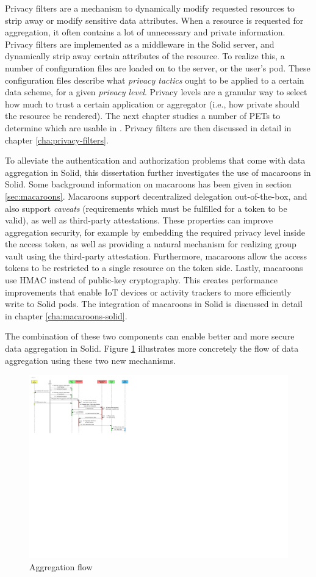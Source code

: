 Privacy filters are a mechanism to dynamically modify requested resources to strip away or modify sensitive data attributes. When a resource is requested for aggregation, it often contains a lot of unnecessary and private information. Privacy filters are implemented as a middleware in the Solid server, and dynamically strip away certain attributes of the resource. To realize this, a number of configuration files are loaded on to the server, or the user's pod. These configuration files describe what \textit{privacy tactics} ought to be applied to a certain data scheme, for a given \textit{privacy level}. Privacy levels are a granular way to select how much to trust a certain application or aggregator (i.e., how private should the resource be rendered). The next chapter studies a number of \gls{PETs} to determine which are usable in \middleware{}. Privacy filters are then discussed in detail in chapter \ref{cha:privacy-filters}. 

To alleviate the authentication and authorization problems that come with data aggregation in Solid, this dissertation further investigates the use of macaroons in Solid. Some background information on macaroons has been given in section \ref{sec:macaroons}. Macaroons support decentralized delegation out-of-the-box, and also support \textit{caveats} (requirements which must be fulfilled for a token to be valid), as well as third-party attestations. These properties can improve aggregation security, for example by embedding the required privacy level inside the access token, as well as providing a natural mechanism for realizing group vault using the third-party attestation. Furthermore, macaroons allow the access tokens to be restricted to a single resource on the token side. Lastly, macaroons use \acrfull{HMAC} instead of public-key cryptography. This creates performance improvements that enable IoT devices or activity trackers to more efficiently write to Solid pods. The integration of macaroons in Solid is discussed in detail in chapter \ref{cha:macaroons-solid}.

The combination of these two components can enable better and more secure data aggregation in Solid. Figure \ref{fig:aggregation-flow} illustrates more concretely the flow of data aggregation using these two new mechanisms.

\begin{figure}
    \centering
    \includegraphics[width=1.0\textwidth]{images/architecture/InteractionDiagram-Aggregation-flow.pdf}
    \caption{Aggregation flow}
    \label{fig:aggregation-flow}
\end{figure}
